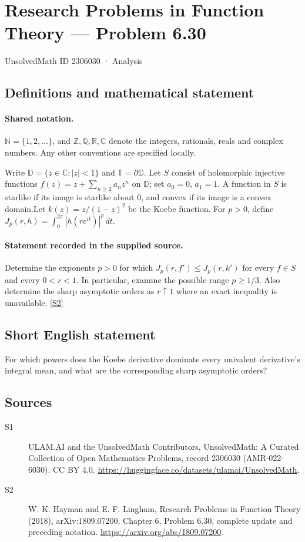 \documentclass[11pt]{article}
\newcommand{\sref}[2]{\hyperlink{source:#1:#2}{[S#2]}}
\begin{document}
\setcounter{section}{2306029}
\section{Research Problems in Function Theory — Problem 6.30}\label{2306030}
{\small\sffamily UnsolvedMath ID 2306030 · Analysis}
\subsection{Definitions and mathematical statement}

\paragraph{Shared notation.}$\mathbb N=\{1,2,\ldots\}$, and $\mathbb Z,\mathbb Q,\mathbb R,\mathbb C$ denote the integers, rationals, reals and complex numbers. Any other conventions are specified locally.


Write $\mathbb D=\{z\in\mathbb C:|z|<1\}$ and $\mathbb T=\partial\mathbb D$. Let $S$ consist of holomorphic injective functions $f(z)=z+\sum_{n\ge2}a_nz^n$ on $\mathbb D$; set $a_0=0$, $a_1=1$. A function in $S$ is starlike if its image is starlike about $0$, and convex if its image is a convex domain.Let $k(z)=z/(1-z)^2$ be the Koebe function. For $p>0$, define $J_p(r,h)=\int_0^{2\pi}|h(re^{it})|^p\,dt$.
\paragraph{Statement recorded in the supplied source.}
Determine the exponents $p>0$ for which $J_p(r,f')\le J_p(r,k')$ for every $f\in S$ and every $0<r<1$. In particular, examine the possible range $p\ge1/3$. Also determine the sharp asymptotic orders as $r\uparrow1$ where an exact inequality is unavailable. \sref{2306030}{2}
\subsection{Short English statement}
For which powers does the Koebe derivative dominate every univalent derivative’s integral mean, and what are the corresponding sharp asymptotic orders?
\subsection{Sources}
\begin{description}
\item[\hypertarget{source:2306030:1}{S1}] ULAM.AI and the UnsolvedMath Contributors, UnsolvedMath: A Curated Collection of Open Mathematics Problems, record 2306030 (AMR-022-6030). CC BY 4.0. \url{https://huggingface.co/datasets/ulamai/UnsolvedMath}.
\item[\hypertarget{source:2306030:2}{S2}] W. K. Hayman and E. F. Lingham, Research Problems in Function Theory (2018), arXiv:1809.07200, Chapter 6, Problem 6.30, complete update and preceding notation. \url{https://arxiv.org/abs/1809.07200}.
\end{description}
\label{end:2306030}
\end{document}
